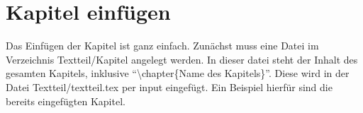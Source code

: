 
\chapter{Kapitel einfügen}

Das Einfügen der Kapitel ist ganz einfach. Zunächst muss eine Datei im Verzeichnis Textteil/Kapitel angelegt werden. In dieser datei steht der Inhalt des gesamten Kapitels, inklusive \enquote{\textbackslash chapter\{Name des Kapitels\}}. Diese wird in der Datei Textteil/textteil.tex per input eingefügt. Ein Beispiel hierfür sind die bereits eingefügten Kapitel.